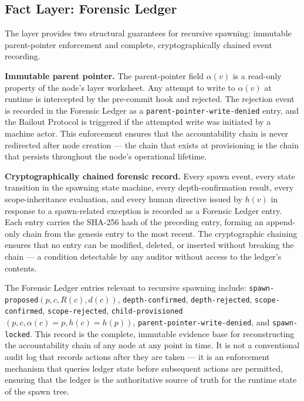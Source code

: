 \subsection{Fact Layer: Forensic Ledger}
\label{sec:fact-fledger}

The \fact{} layer provides two structural guarantees for recursive spawning:
immutable parent-pointer enforcement and complete, cryptographically chained
event recording.

\textbf{Immutable parent pointer.} The parent-pointer field $\alpha(v)$ is a
read-only property of the node's \fact{} layer worksheet. Any attempt to write
to $\alpha(v)$ at runtime is intercepted by the pre-commit hook and rejected.
The rejection event is recorded in the Forensic Ledger as a
\texttt{parent-pointer-write-denied} entry, and the Bailout Protocol is triggered
if the attempted write was initiated by a machine actor. This enforcement ensures
that the accountability chain is never redirected after node creation — the
chain that exists at provisioning is the chain that persists throughout the
node's operational lifetime.

\textbf{Cryptographically chained forensic record.} Every spawn event, every
state transition in the spawning state machine, every depth-confirmation
result, every scope-inheritance evaluation, and every human directive issued
by $h(v)$ in response to a spawn-related exception is recorded as a Forensic
Ledger entry. Each entry carries the SHA-256 hash of the preceding entry,
forming an append-only chain from the genesis entry to the most recent. The
cryptographic chaining ensures that no entry can be modified, deleted, or
inserted without breaking the chain — a condition detectable by any auditor
without access to the ledger's contents.

The Forensic Ledger entries relevant to recursive spawning include:
\texttt{spawn-proposed}$(p, c, R(c), d(c))$, \texttt{depth-confirmed},
\texttt{depth-rejected}, \texttt{scope-confirmed}, \texttt{scope-rejected},
\texttt{child-provisioned}$(p, c, \alpha(c)=p, h(c)=h(p))$,
\texttt{parent-pointer-write-denied}, and \texttt{spawn-locked}. This record is
the complete, immutable evidence base for reconstructing the accountability
chain of any node at any point in time. It is not a conventional audit log that
records actions after they are taken — it is an enforcement mechanism that
queries ledger state before subsequent actions are permitted, ensuring that the
ledger is the authoritative source of truth for the runtime state of the spawn
tree.

